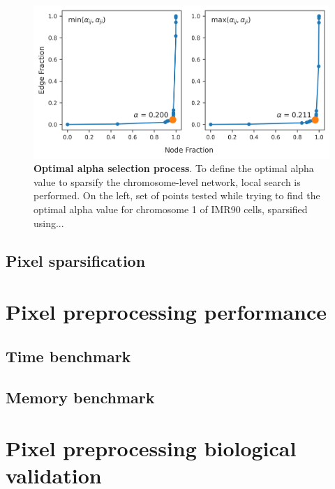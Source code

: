 \begin{figure}[h]
  \centering 
  \includegraphics[width=1\textwidth]{alpha_tables.png}
  \caption{\textbf{Optimal alpha selection process}. To define the optimal alpha value to sparsify the chromosome-level network, local search is performed. On the left, set of points tested while trying to find the optimal alpha value for chromosome 1 of IMR90 cells, sparsified using... }
  \label{fig:alphas}
\end{figure}

\subsection{Pixel sparsification}


\section{Pixel preprocessing performance}

\subsection{Time benchmark}
\subsection{Memory benchmark}

\section{Pixel preprocessing biological validation}

